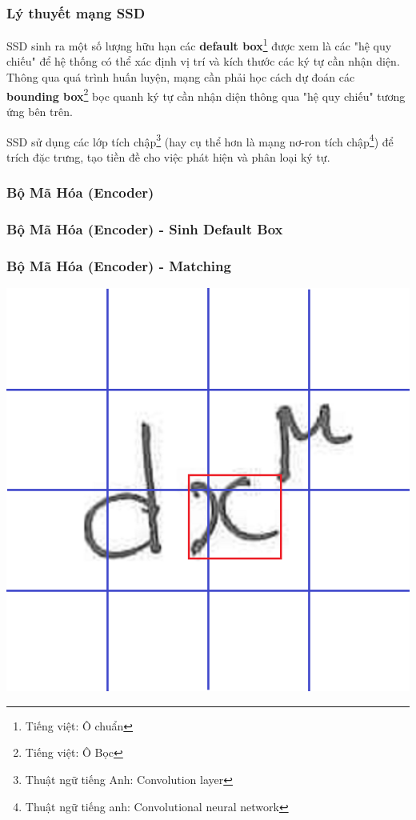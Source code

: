 \documentclass{beamer}
\begin{document}
\begin{frame}
\frametitle{Lý thuyết mạng SSD}

SSD\cite{liu2016ssd} sinh ra một số lượng hữu hạn các \textbf{default box}\footnote{Tiếng việt: Ô chuẩn} được xem là các "hệ quy chiếu" để hệ thống có thể xác định vị trí và kích thước các ký tự cần nhận diện. Thông qua quá trình huấn luyện, mạng cần phải học cách dự đoán các \textbf{bounding box}\footnote{Tiếng việt: Ô Bọc} bọc quanh ký tự cần nhận diện thông qua "hệ quy chiếu" tương ứng bên trên.

SSD\cite{liu2016ssd} sử dụng các lớp tích chập\footnote{Thuật ngữ tiếng Anh: Convolution layer} (hay cụ thể hơn là mạng nơ-ron tích chập\footnote{Thuật ngữ tiếng anh: Convolutional neural network}) để trích đặc trưng, tạo tiền đề cho việc phát hiện và phân loại ký tự. \\

\end{frame}



\subsubsection{Bộ Mã Hóa (Encoder)}
\begin{frame}
\frametitle{Bộ Mã Hóa (Encoder) - Sinh Default Box}

\end{frame}


\begin{frame}
\frametitle{Bộ Mã Hóa (Encoder) - Matching}


\begin{center}
\centering
\includegraphics[width=0.6\linewidth]{GT.png}
\end{center}

\end{frame}
\end{document}
